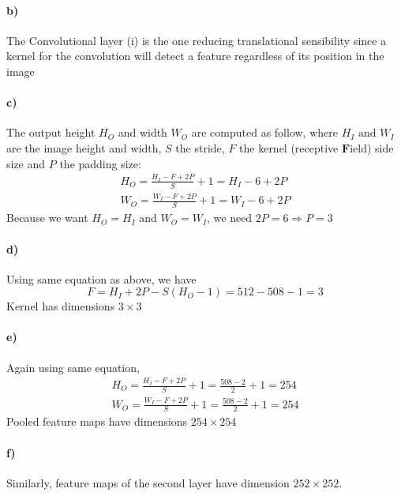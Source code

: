 \documentclass{article}
\begin{document}
\paragraph{b)}
The Convolutional  layer (i) is the one reducing translational sensibility since a kernel for the convolution will detect a feature regardless of its position in the image

\paragraph{c)}
The output height $H_O$ and width $W_O$ are computed as follow, where $H_I \text{ and } W_I $ are the image height and width, $S$ the stride, $F$ the kernel (receptive $\textbf{F}$ield) side size and $P$ the padding size:
\[
	\begin{aligned}
		H_O = \frac{H_I - F + 2P}{S} + 1 = H_I - 6 + 2P \\
		W_O = \frac{W_I - F + 2P}{S} + 1 = W_I - 6 + 2P
	\end{aligned}
\]
Because we want $H_O = H_I$ and $W_O = W_I$, we need $2P = 6 \Rightarrow P = 3$

\paragraph{d)}
Using same equation as above, we have
\[
	F = H_I + 2P - S(H_O - 1) = 512 - 508 - 1 = 3
\]
Kernel has dimensions $ 3 \times 3 $

\paragraph{e)}
Again using same equation,
\[
	\begin{aligned}
		H_O = \frac{H_I - F + 2P}{S} + 1 = \frac{508 - 2}{2} + 1 = 254 \\
		W_O = \frac{W_I - F + 2P}{S} + 1 = \frac{508 - 2}{2} + 1 = 254
	\end{aligned}
\]
Pooled feature maps have dimensions $254 \times 254$

\paragraph{f)}
Similarly, feature maps of the second layer have dimension $252 \times 252$.
\end{document}
